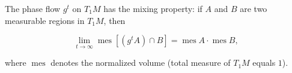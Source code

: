 The phase flow $g^t$ on $T_1M$ has the mixing property: if $A$ and $B$ are two measurable regions in $T_1M$, then

$$\lim_{t \to \infty} \operatorname{mes}[(g^t A) \cap B] = \operatorname{mes} A \cdot \operatorname{mes} B,$$

where $\operatorname{mes}$ denotes the normalized volume (total measure of $T_1M$ equals $1$).
